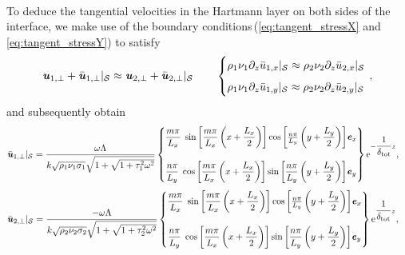 \documentclass[aps,prfluids,reprint,superscriptaddress]{revtex4-2}
\newcommand{\h}[1]{\textbf{\textit{#1}}}
\newcommand{\ii}[1]{\text{#1}}
\begin{document}
\\
\indent To deduce the tangential velocities in the Hartmann layer on both sides of the interface, we make use of the boundary conditions\,(\ref{eq:tangent_stressX} and \ref{eq:tangent_stressY}) to satisfy
\begin{equation}
	{\h u}_{1,\perp} +  {\bar{\h u}}_{1,\perp}|_\mathcal{S} 
	\approx
	{\h u}_{2,\perp} +  {\bar{\h u}}_{2,\perp}|_\mathcal{S} 
	\qquad
	\begin{cases}
		\rho_1\nu_1\partial_z{\bar{u}}_{1,x}|_\mathcal{S} 
		\approx
		\rho_2\nu_2\partial_z{\bar{u}}_{2,x}|_\mathcal{S} \\[5pt]
		\rho_1\nu_1\partial_z{\bar{u}}_{1,y}|_\mathcal{S} 
		\approx
		\rho_2\nu_2\partial_z{\bar{u}}_{2,y}|_\mathcal{S}
	\end{cases}\hspace{-3mm},
	\label{eq:interface_jump_condition}
\end{equation}
and subsequently obtain
\begin{align}
	{\bar{\h u}}_{1,\perp}|_{\mathcal S}
	&=
	\frac{\omega\Lambda}{k\sqrt{\rho_1\nu_1\sigma_1}
		\sqrt{1 + \sqrt{1 + \tau_1^2\omega^2} }
	}
	\begin{Bmatrix}
		\dfrac{m\pi}{L_x}
		\;\sin{\left[\dfrac{m\pi}{L_x}\left( x + \dfrac{L_x}{2} \right)\right]}
		\cos{\left[\frac{n\pi}{L_y}\left( y + \dfrac{L_y}{2} \right)\right]}
		\h e_x 
		\\[20pt]
		\dfrac{n\pi}{L_y}
		\;\cos{\left[\dfrac{m\pi}{L_x}\left( x + \dfrac{L_x}{2} \right)\right]}
		\sin{\left[\dfrac{n\pi}{L_y}\left( y + \dfrac{L_y}{2} \right)\right]}
		\h e_y
	\end{Bmatrix} \ii{e}^{-
		\dfrac{1}{\delta_{\rm tot}}
		z} ,
	\label{eq:Ha_int_up_velocity}
\end{align}
\begin{align}
	{\bar{\h u}}_{2,\perp}|_{\mathcal S}
	&=
	\frac{-\omega\Lambda}{k\sqrt{\rho_2\nu_2\sigma_2}
		\sqrt{1 + \sqrt{1 + \tau_2^2\omega^2} }
	}
	\begin{Bmatrix}
		\dfrac{m\pi}{L_x}
		\;\sin{\left[\dfrac{m\pi}{L_x}\left( x + \dfrac{L_x}{2} \right)\right]}
		\cos{\left[\frac{n\pi}{L_y}\left( y + \dfrac{L_y}{2} \right)\right]}
		\h e_x 
		\\[20pt]
		\dfrac{n\pi}{L_y}
		\;\cos{\left[\dfrac{m\pi}{L_x}\left( x + \dfrac{L_x}{2} \right)\right]}
		\sin{\left[\dfrac{n\pi}{L_y}\left( y + \dfrac{L_y}{2} \right)\right]}
		\h e_y
	\end{Bmatrix} \ii{e}^{
		\dfrac{1}{\delta_{\rm tot}}
		z} ,
	\label{eq:Ha_int_dwn_velocity}
\end{align}
\end{document}
